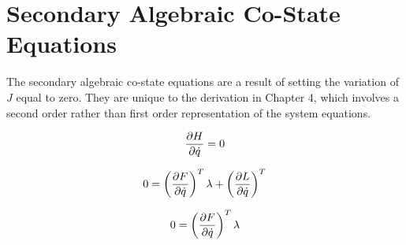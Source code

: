\section{Secondary Algebraic Co-State Equations}

The secondary algebraic co-state equations are a result of setting the variation of $J$ equal to zero. They are unique to the derivation in Chapter 4, which involves a second order rather than first order representation of the system equations.

\begin{equation}
    \frac{\partial H}{\partial \dot q} = 0
\end{equation}

\begin{equation}
0 = \left(\frac{\partial F}{\partial \dot q}\right)^T \lambda + \left(\frac{\partial L}{\partial \dot q}\right)^T
\end{equation}

\begin{equation}
    0 = \left(\frac{\partial F}{\partial \dot q}\right)^T \lambda
\end{equation}

